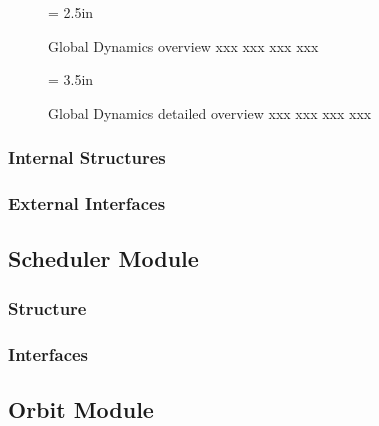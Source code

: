 \documentclass{article}[12pt]
\def\filler{xxxx xxxx xxxx xxxx xxxx xxxx xxxx xxxx xxxx xxxx xxxx xxxx
xxxx xxxx xxxx xxxx xxxx xxxx xxxx xxxx xxxx xxxx xxxx xxxx
xxxx xxxx xxxx xxxx xxxx xxxx xxxx xxxx xxxx xxxx xxxx xxxx
xxxx xxxx xxxx xxxx xxxx xxxx xxxx xxxx xxxx xxxx xxxx xxxx
xxxx xxxx xxxx xxxx xxxx xxxx xxxx xxxx xxxx xxxx xxxx xxxx
xxxx xxxx xxxx xxxx xxxx xxxx xxxx xxxx xxxx xxxx xxxx xxxx
xxxx xxxx xxxx xxxx xxxx xxxx xxxx xxxx xxxx xxxx xxxx xxxx
xxxx xxxx xxxx xxxx xxxx xxxx xxxx xxxx xxxx xxxx xxxx xxxx}
\def\filler{}
\begin{document}
\begin{figure}[htb]
\begin{center}
\epsfxsize = 2.5in
\caption
{Global Dynamics overview xxx xxx xxx xxx}
\label{fig:gsd1}
\end{center}
\end{figure}

\begin{figure}[htb]
\begin{center}
\epsfxsize = 3.5in
\caption
{Global Dynamics detailed overview xxx xxx xxx xxx}
\label{fig:gsd2}
\end{center}
\end{figure}

\clearpage

\filler

\subsubsection{Internal Structures}

\filler

\subsubsection{External Interfaces}

\filler

\subsection{Scheduler Module}

\filler

\subsubsection{Structure}

\filler

\subsubsection{Interfaces}

\filler


\filler


\filler

\subsection{Orbit Module}
\end{document}
